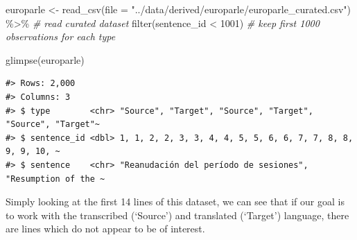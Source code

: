 \documentclass[
]{article}
\newenvironment{Shaded}{\begin{snugshade}}{\end{snugshade}}
\newcommand{\AttributeTok}[1]{\textcolor[rgb]{0.77,0.63,0.00}{#1}}
\newcommand{\CommentTok}[1]{\textcolor[rgb]{0.56,0.35,0.01}{\textit{#1}}}
\newcommand{\DecValTok}[1]{\textcolor[rgb]{0.00,0.00,0.81}{#1}}
\newcommand{\FunctionTok}[1]{\textcolor[rgb]{0.00,0.00,0.00}{#1}}
\newcommand{\NormalTok}[1]{#1}
\newcommand{\OtherTok}[1]{\textcolor[rgb]{0.56,0.35,0.01}{#1}}
\newcommand{\SpecialCharTok}[1]{\textcolor[rgb]{0.00,0.00,0.00}{#1}}
\newcommand{\StringTok}[1]{\textcolor[rgb]{0.31,0.60,0.02}{#1}}
\begin{document}
\begin{Shaded}
\begin{Highlighting}[]
\NormalTok{europarle }\OtherTok{\textless{}{-}} \FunctionTok{read\_csv}\NormalTok{(}\AttributeTok{file =} \StringTok{"../data/derived/europarle/europarle\_curated.csv"}\NormalTok{) }\SpecialCharTok{\%\textgreater{}\%}  \CommentTok{\# read curated dataset}
  \FunctionTok{filter}\NormalTok{(sentence\_id }\SpecialCharTok{\textless{}} \DecValTok{1001}\NormalTok{) }\CommentTok{\# keep first 1000 observations for each type}

\FunctionTok{glimpse}\NormalTok{(europarle)}
\end{Highlighting}
\end{Shaded}

\begin{verbatim}
#> Rows: 2,000
#> Columns: 3
#> $ type        <chr> "Source", "Target", "Source", "Target", "Source", "Target"~
#> $ sentence_id <dbl> 1, 1, 2, 2, 3, 3, 4, 4, 5, 5, 6, 6, 7, 7, 8, 8, 9, 9, 10, ~
#> $ sentence    <chr> "Reanudación del período de sesiones", "Resumption of the ~
\end{verbatim}

Simply looking at the first 14 lines of this dataset, we can see that if our goal is to work with the transcribed (`Source') and translated (`Target') language, there are lines which do not appear to be of interest.
\end{document}
